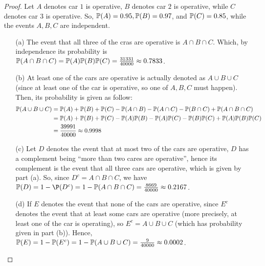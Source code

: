 \documentclass{article}
\begin{document}
\begin{proof}

    Let $A$ denotes car $1$ is operative, $B$ denotes car $2$ is operative, while $C$ denotes car $3$ is operative. So, $\mathbb{P}(A)=0.95,\mathbb{P}(B)=0.97$, and $\mathbb{P}(C)=0.85$, while the events $A,B,C$ are independent.

    \begin{itemize}
        \item[(a)] The event that all three of the cras are operative is $A \cap B\cap C$. Which, by independence its probability is $\mathbb{P}(A\cap B\cap C)=\mathbb{P}(A)\mathbb{P}(B)\mathbb{P}(C)=\frac{31331}{40000}\approx 0.7833$.
        \item[(b)] At least one of the cars are operative is actually denoted as $A \cup B\cup C$ (since at least one of the car is operative, so one of $A,B,C$ must happen). Then, its probability is given as follow:
        \begin{align}
            \mathbb{P}(A\cup B\cup C)&=\mathbb{P}(A)+\mathbb{P}(B)+\mathbb{P}(C) - \mathbb{P}(A\cap B)-\mathbb{P}(A\cap C) -\mathbb{P}(B\cap C)+\mathbb{P}(A\cap B\cap C)\\
            &= \mathbb{P}(A)+\mathbb{P}(B)+\mathbb{P}(C)-\mathbb{P}(A)\mathbb{P}(B)-\mathbb{P}(A)\mathbb{P}(C)-\mathbb{P}(B)\mathbb{P}(C) + \mathbb{P}(A)\mathbb{P}(B)\mathbb{P}(C)\\
            &= \frac{39991}{40000}\approx 0.9998
        \end{align}
        \item[(c)] Let $D$ denotes the event that at most two of the cars are operative, $D$ has a complement being ``more than two cares are operative'', hence its complement is the event that all three cars are operative, which is given by part (a). So, since $D^c=A\cap B\cap C$, we have $\PP(D)=1-\P(D^c)=1-\PP(A\cap B\cap C)=\frac{8669}{40000}\approx 0.2167$.
        \item[(d)] If $E$ denotes the event that none of the cars are operative, since $E^c$ denotes the event that at least some cars are operative (more precisely, at least one of the car is operating), so $E^c=A\cup B\cup C$ (which has probability given in part (b)). Hence, $\mathbb{P}(E)=1-\mathbb{P}(E^c)=1-\mathbb{P}(A\cup B\cup C)=\frac{9}{40000}\approx 0.0002$.
    \end{itemize}
\end{proof}

\hfil
\end{document}

